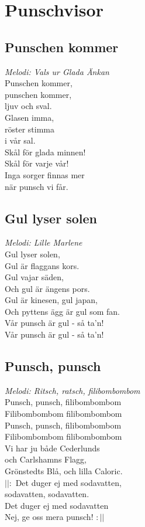 \chapter{Punschvisor}
\section{Punschen kommer}
\textit{Melodi: Vals ur Glada Änkan}
\vspace{2mm}\\
Punschen kommer,\\
punschen kommer,\\
ljuv och sval.\\
Glasen imma,\\
röster stimma\\
i vår sal.\\
Skål för glada minnen!\\
Skål för varje vår!\\
Inga sorger finnas mer\\
när punsch vi får.

\newpage
\section{Gul lyser solen}
\textit{Melodi: Lille Marlene }
\vspace{2mm}\\
Gul lyser solen,\\
Gul är flaggans kors.\\
Gul vajar säden,\\
Och gul är ängens pors.\\
Gul är kinesen, gul japan,\\
Och pyttens ägg är gul som fan.\\
Vår punsch är gul - så ta'n!\\
Vår punsch är gul - så ta'n!

\section{Punsch, punsch}
\textit{Melodi: Ritsch, ratsch, filibombombom}
\vspace{2mm}\\
Punsch, punsch, filibombombom\\
Filibombombom filibombombom\\
Punsch, punsch, filibombombom\\
Filibombombom filibombombom\\
Vi har ju både Cederlunds\\
och Carlshamns Flagg,\\
Grönstedts Blå, och lilla Caloric.\\
$||:$ Det duger ej med sodavatten,\\
sodavatten, sodavatten.\\
Det duger ej med sodavatten\\
Nej, ge oss mera punsch! $:||$

